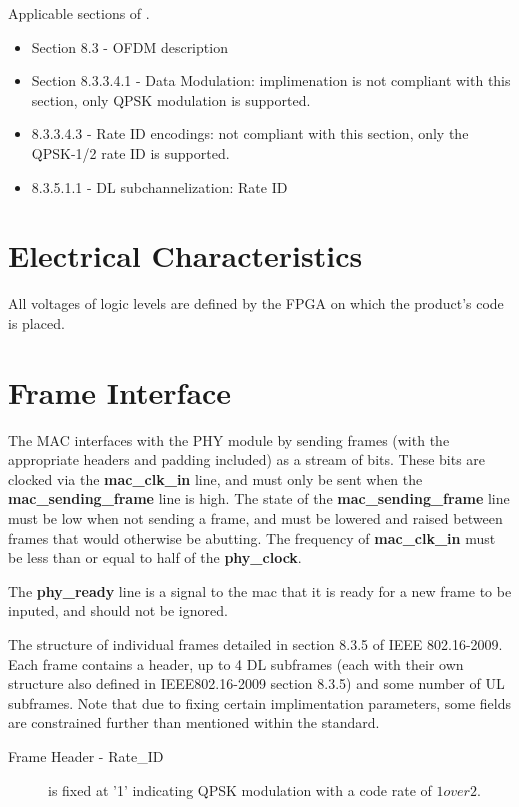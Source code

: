 \documentclass[dvips,10pt,twocolumn]{article}
\begin{document}
	Applicable sections of \cite{IEEE:802.16}.
	\begin{itemize}
		\item Section 8.3 - OFDM description
		\item Section 8.3.3.4.1 - Data Modulation: implimenation
			is not compliant with this section, only QPSK
			modulation is supported.
		\item 8.3.3.4.3 - Rate ID encodings: not compliant with
			this section, only the QPSK-1/2 rate ID is supported.
		\item 8.3.5.1.1 - DL subchannelization: Rate ID
	\end{itemize}
\section{Electrical Characteristics}
All voltages of logic levels are defined by the FPGA on which the product's
code is placed.

\section{Frame Interface}
\label{sec:frame}
The MAC interfaces with the PHY module by sending frames (with the
appropriate headers and padding included) as a stream of bits.  These bits
are clocked via the \textbf{mac\_clk\_in} line, and must only be sent when
the \textbf{mac\_sending\_frame} line is high.  The state of the
\textbf{mac\_sending\_frame} line must be low when not sending a frame, and
must be lowered and raised between frames that would otherwise be abutting.
The frequency of \textbf{mac\_clk\_in} must be less than or equal to half
of the \textbf{phy\_clock}.

The \textbf{phy\_ready} line is a signal to the mac that it is ready for a
new frame to be inputed, and should not be ignored.

The structure of individual frames detailed in section 8.3.5 of IEEE
802.16-2009.  Each frame contains a header, up to 4 DL subframes (each with
their own structure also defined in IEEE802.16-2009 section 8.3.5) and some
number of UL subframes.  Note that due to fixing certain implimentation
parameters, some fields are constrained further than mentioned within the
standard.

\begin{description}
	
	\item[Frame Header - Rate\_ID] is fixed at '1' indicating QPSK
		modulation with a code rate of $1 over 2$.
	
	\item[] \end{description}
\end{document}
